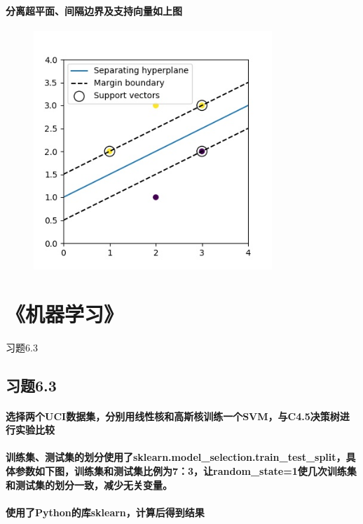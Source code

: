 \documentclass[UTF8]{ctexart}
\begin{document}
\paragraph{分离超平面、间隔边界及支持向量如上图}
\begin{figure}[htp]
    \includegraphics[width=9cm, height=9cm]{fig.jpg}
\end{figure}
\paragraph{}


\section{《机器学习》}习题6.3
\subsection{习题6.3}
\paragraph{选择两个UCI数据集，分别用线性核和高斯核训练一个SVM，与C4.5决策树进行实验比较}
\paragraph{训练集、测试集的划分使用了sklearn.model\_selection.train\_test\_split，具体参数如下图，训练集和测试集比例为7：3，让random\_state=1使几次训练集和测试集的划分一致，减少无关变量。}
\paragraph{使用了Python的库sklearn，计算后得到结果}
\end{document}
